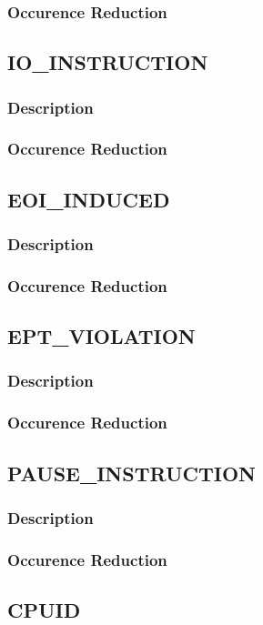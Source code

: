 \documentclass[MMR,Master,english]{twbook}
\begin{document}
\subsubsection{Occurence Reduction}
\clearpage
\subsection{IO\_INSTRUCTION}
\subsubsection{Description}
\subsubsection{Occurence Reduction}
\clearpage
\subsection{EOI\_INDUCED}
\subsubsection{Description}
\subsubsection{Occurence Reduction}
\clearpage
\subsection{EPT\_VIOLATION}
\subsubsection{Description}
\subsubsection{Occurence Reduction}
\clearpage
\subsection{PAUSE\_INSTRUCTION}
\subsubsection{Description}
\subsubsection{Occurence Reduction}
\clearpage
\subsection{CPUID}
\end{document}

